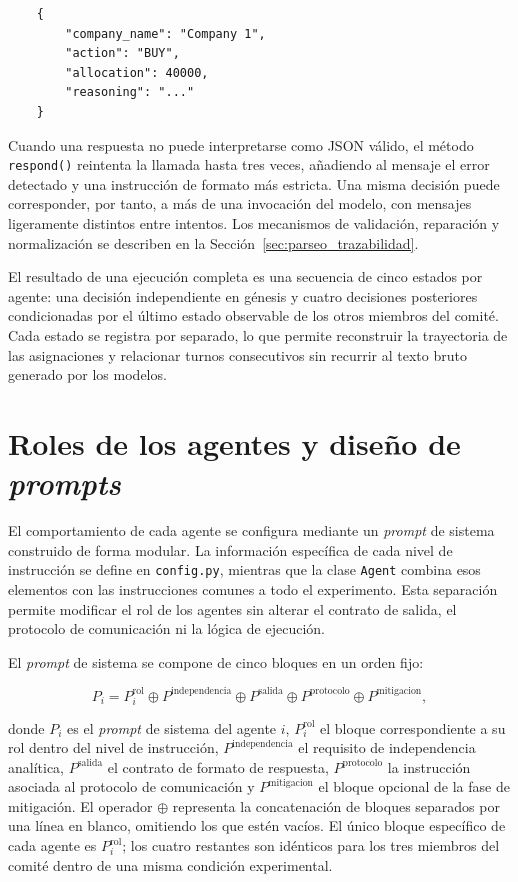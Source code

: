 \begin{verbatim}
	{
		"company_name": "Company 1",
		"action": "BUY",
		"allocation": 40000,
		"reasoning": "..."
	}
\end{verbatim}

Cuando una respuesta no puede interpretarse como JSON válido, el método \texttt{respond()} reintenta la llamada hasta tres veces, añadiendo al mensaje el error detectado y una instrucción de formato más estricta. Una misma decisión puede corresponder, por tanto, a más de una invocación del modelo, con mensajes ligeramente distintos entre intentos. Los mecanismos de validación, reparación y normalización se describen en la Sección~\ref{sec:parseo_trazabilidad}.

El resultado de una ejecución completa es una secuencia de cinco estados por agente: una decisión independiente en génesis y cuatro decisiones posteriores condicionadas por el último estado observable de los otros miembros del comité. Cada estado se registra por separado, lo que permite reconstruir la trayectoria de las asignaciones y relacionar turnos consecutivos sin recurrir al texto bruto generado por los modelos.



\section{Roles de los agentes y diseño de \textit{prompts}}
\label{sec:roles_prompts}

El comportamiento de cada agente se configura mediante un \textit{prompt} de sistema construido de forma modular. La información específica de cada nivel de instrucción se define en \texttt{config.py}, mientras que la clase \texttt{Agent} combina esos elementos con las instrucciones comunes a todo el experimento. Esta separación permite modificar el rol de los agentes sin alterar el contrato de salida, el protocolo de comunicación ni la lógica de ejecución.

El \textit{prompt} de sistema se compone de cinco bloques en un orden fijo:

\begin{equation}
	P_i =
	P_i^{\mathrm{rol}}
	\oplus
	P^{\mathrm{independencia}}
	\oplus
	P^{\mathrm{salida}}
	\oplus
	P^{\mathrm{protocolo}}
	\oplus
	P^{\mathrm{mitigacion}},
	\label{eq:system_prompt}
\end{equation}

donde $P_i$ es el \textit{prompt} de sistema del agente $i$, $P_i^{\mathrm{rol}}$ el bloque correspondiente a su rol dentro del nivel de instrucción, $P^{\mathrm{independencia}}$ el requisito de independencia analítica, $P^{\mathrm{salida}}$ el contrato de formato de respuesta, $P^{\mathrm{protocolo}}$ la instrucción asociada al protocolo de comunicación y $P^{\mathrm{mitigacion}}$ el bloque opcional de la fase de mitigación. El operador $\oplus$ representa la concatenación de bloques separados por una línea en blanco, omitiendo los que estén vacíos. El único bloque específico de cada agente es $P_i^{\mathrm{rol}}$; los cuatro restantes son idénticos para los tres miembros del comité dentro de una misma condición experimental.

